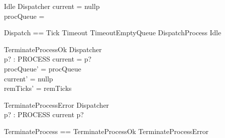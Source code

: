 \begin{schema}{Idle}
    \Xi Dispatcher
\where
    current = nullp \\
    procQueue = \emptyset
\end{schema}

\begin{zed}
    Dispatch == Tick \lor Timeout \lor TimeoutEmptyQueue \lor DispatchProcess \lor Idle
\end{zed}

\begin{schema}{TerminateProcessOk}
    \Delta Dispatcher \\
    p? : PROCESS
\where
    current = p? \\
    procQueue' = procQueue \\
    current' = nullp \\
    remTicks' = remTicks
\end{schema}

\begin{schema}{TerminateProcessError}
    \Xi Dispatcher \\
    p? : PROCESS
\where
    current \neq p?
\end{schema}

\begin{zed}
    TerminateProcess == TerminateProcessOk \lor TerminateProcessError
\end{zed}
